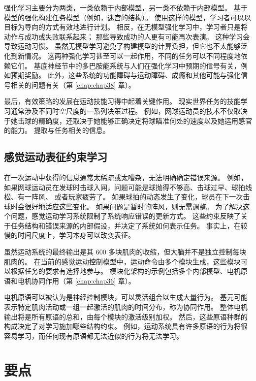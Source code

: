强化学习主要分为两类，一类依赖于内部模型，另一类不依赖于内部模型。
基于模型的强化构建任务模型（例如，迷宫的结构）。
使用这样的模型，学习者可以以目标为导向的方式有效地进行计划。
相反，在无模型强化学习中，学习者只是将动作与成功或失败联系起来；
那些导致成功的人更有可能再次表演。
这种学习会导致运动习惯。
虽然无模型学习避免了构建模型的计算负担，但它也不太能够泛化到新情况。
这两种强化学习甚至可以一起作用，不同的任务可以不同程度地依赖它们。
基底神经节中的多巴胺能系统与人们在强化学习中预期的信号有关，例如预期奖励。
此外，这些系统的功能障碍与运动障碍、成瘾和其他可能与强化信号相关的问题有关（第 \ref{chap:chap38} 章）。


最后，有效策略的发展在运动技能习得中起着关键作用。
现实世界任务的技能学习通常涉及不同时空尺度的一系列决策过程。
例如，网球运动员的技术不仅取决于她击球的精确度，还取决于她能够正确决定将球瞄准何处的速度以及她运用感官的能力。
提取与任务相关的信息。


\subsection{感觉运动表征约束学习}

在一次运动中获得的信息通常太稀疏或太嘈杂，无法明确确定错误来源。
例如，如果网球运动员在发球时击球入网，问题可能是球抛得不够高、击球过早、球拍线松、有一阵风、 或者玩家疲劳了。
如果球拍的动态发生了变化，球员在下一次击球时会很好地适应这些变化。
如果问题是暂时的阵风，则无需调整。
为了解决这个问题，感觉运动学习系统限制了系统响应错误的更新方式。
这些约束反映了关于任务结构和错误来源的内部假设，并决定了系统如何表示任务。
事实上，在较慢的时间尺度上，学习本身可以改变表征。


虽然运动系统的最终输出是其 600 多块肌肉的收缩，但大脑并不是独立控制每块肌肉的。
在当前的感觉运动控制模型中，运动命令由多个模块生成，这些模块可以根据任务的要求有选择地参与。
模块化架构的示例包括多个内部模型、电机原语和电机协同作用（第 \ref{chap:chap36} 章）。


电机原语可以被认为是神经控制模块，可以灵活组合以生成大量行为。
基元可能表示特定肌肉活动或一组一起激活的肌肉的时间分布，称为协同作用。
整体电机输出将是所有原语的总和，由每个模块的激活级别加权。
然后，这些原语种群的构成决定了对学习施加哪些结构约束。
例如，运动系统具有许多原语的行为将很容易学习，而任何现有原语都无法近似的行为将无法学习。



\section{要点}

